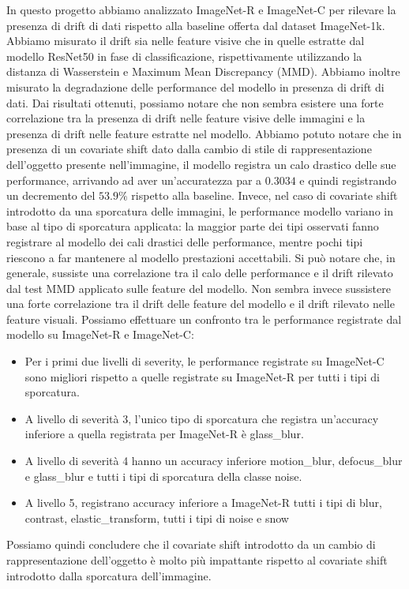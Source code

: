 In questo progetto abbiamo analizzato  ImageNet-R e ImageNet-C per rilevare la presenza di drift di dati rispetto alla baseline offerta dal dataset ImageNet-1k. Abbiamo misurato il drift sia nelle feature visive che in quelle estratte dal modello ResNet50 in fase di classificazione, rispettivamente utilizzando la distanza di Wasserstein e Maximum Mean Discrepancy (MMD). Abbiamo inoltre misurato la degradazione delle performance del modello in presenza di drift di dati.
Dai risultati ottenuti, possiamo notare che non sembra esistere una forte correlazione tra la presenza di drift nelle feature visive delle immagini e la presenza di drift nelle feature estratte nel modello. Abbiamo potuto notare che in presenza di un covariate shift dato dalla cambio di stile di rappresentazione dell'oggetto presente nell'immagine, il modello registra un calo drastico delle sue performance, arrivando ad aver un'accuratezza par a $0.3034$ e quindi registrando un decremento del $53.9\%$ rispetto alla baseline. Invece, nel caso di covariate shift introdotto da una sporcatura delle immagini, le performance modello variano in base al tipo di sporcatura applicata: la maggior parte dei tipi osservati fanno registrare al modello dei cali drastici delle performance, mentre pochi tipi riescono a far mantenere al modello prestazioni accettabili. Si può notare che, in generale, sussiste una correlazione tra il calo delle performance e il drift rilevato dal test MMD applicato sulle feature del modello. Non sembra invece sussistere una forte correlazione tra il drift delle feature del modello e il drift rilevato nelle feature visuali. Possiamo effettuare un confronto tra le performance registrate dal modello su ImageNet-R e ImageNet-C:
\begin{itemize}
    \item Per i primi due livelli di severity, le performance registrate su ImageNet-C sono migliori rispetto a quelle registrate su ImageNet-R per tutti i tipi di sporcatura.
    \item A livello di severità 3, l'unico tipo di sporcatura che registra un'accuracy inferiore a quella registrata per ImageNet-R è glass\_blur.
    \item A livello di severità 4 hanno un accuracy inferiore motion\_blur, defocus\_blur e glass\_blur e tutti i tipi di sporcatura della classe noise.
    \item A livello 5, registrano accuracy inferiore a ImageNet-R tutti i tipi di blur, contrast, elastic\_transform, tutti i tipi di noise e snow
\end{itemize}
Possiamo quindi concludere che il covariate shift introdotto da un cambio di rappresentazione dell'oggetto è molto più impattante rispetto al covariate shift introdotto dalla sporcatura dell'immagine.
